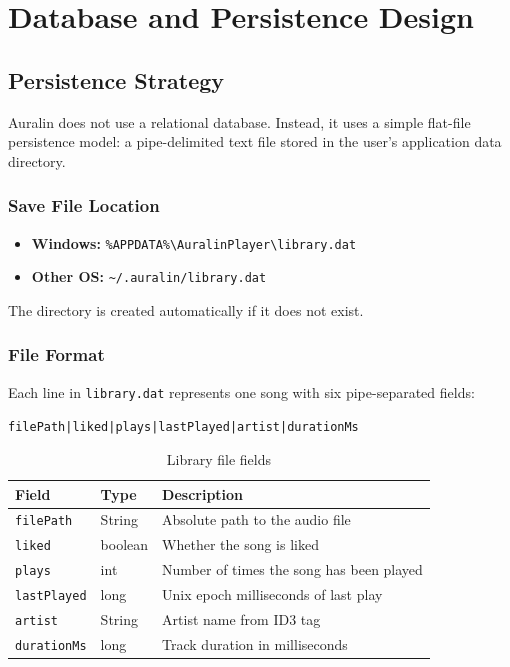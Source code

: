 ﻿\documentclass[12pt]{report}
\begin{document}
\newpage
\chapter{Database and Persistence Design}

\section{Persistence Strategy}
Auralin does not use a relational database. Instead, it uses a simple flat-file persistence model: a pipe-delimited text file stored in the user's application data directory.

\subsection{Save File Location}
\begin{itemize}
    \item \textbf{Windows:} \texttt{\%APPDATA\%\textbackslash AuralinPlayer\textbackslash library.dat}
    \item \textbf{Other OS:} \texttt{\textasciitilde/.auralin/library.dat}
\end{itemize}
The directory is created automatically if it does not exist.

\subsection{File Format}
Each line in \texttt{library.dat} represents one song with six pipe-separated fields:

\begin{center}
\texttt{filePath|liked|plays|lastPlayed|artist|durationMs}
\end{center}

\begin{table}[htbp]
\centering
\caption{Library file fields}
\begin{tabular}{|p{3cm}|p{3cm}|p{7cm}|}
\hline
\textbf{Field} & \textbf{Type} & \textbf{Description} \\ \hline
\texttt{filePath} & String & Absolute path to the audio file \\ \hline
\texttt{liked} & boolean & Whether the song is liked \\ \hline
\texttt{plays} & int & Number of times the song has been played \\ \hline
\texttt{lastPlayed} & long & Unix epoch milliseconds of last play \\ \hline
\texttt{artist} & String & Artist name from ID3 tag \\ \hline
\texttt{durationMs} & long & Track duration in milliseconds \\ \hline
\end{tabular}
\end{table}
\end{document}
